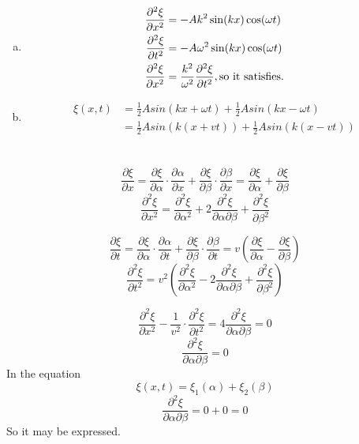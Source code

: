\documentclass{article}
\begin{document}
\section{}
\begin{enumerate}[(a)]
\item
\begin{align*}
\frac{\partial^2\xi}{\partial x^2}&=
-Ak^2\sin(kx)\cos(\omega t)\\
\frac{\partial^2\xi}{\partial t^2}&=
-A\omega^2\sin(kx)\cos(\omega t)\\
\frac{\partial^2\xi}{\partial x^2}&=
\frac{k^2}{\omega^2}\frac{\partial^2\xi}{\partial t^2},
{\rm so\ it\ satisfies.}\\
\end{align*}
\item
\begin{align*}
\xi(x,t)&=\frac{1}{2}Asin(kx+\omega t)+\frac{1}{2}Asin(kx-\omega t)\\
&=\frac{1}{2}Asin(k(x+vt))+\frac{1}{2}Asin(k(x-vt))
\end{align*}
\end{enumerate}

\section{}
$$\frac{\partial\xi}{\partial x}=\frac{\partial\xi}{\partial\alpha}\cdot\frac{\partial\alpha}{\partial x}+\frac{\partial\xi}{\partial\beta}\cdot\frac{\partial\beta}{\partial x}=\frac{\partial\xi}{\partial\alpha}+\frac{\partial\xi}{\partial\beta}$$
$$\frac{\partial^2\xi}{\partial x^2}=\frac{\partial^2\xi}{\partial\alpha^2}+2\frac{\partial^2\xi}{\partial\alpha\partial\beta}+\frac{\partial^2\xi}{\partial\beta^2}$$

$$\frac{\partial\xi}{\partial t}=\frac{\partial\xi}{\partial\alpha}\cdot\frac{\partial\alpha}{\partial t}+\frac{\partial\xi}{\partial\beta}\cdot\frac{\partial\beta}{\partial t}=v\left(\frac{\partial\xi}{\partial\alpha}-\frac{\partial\xi}{\partial\beta}\right)$$
$$\frac{\partial^2\xi}{\partial t^2}=v^2\left(\frac{\partial^2\xi}{\partial\alpha^2}-2\frac{\partial^2\xi}{\partial\alpha\partial\beta}+\frac{\partial^2\xi}{\partial\beta^2}\right)$$

$$\frac{\partial^2\xi}{\partial x^2}-\frac{1}{v^2}\cdot\frac{\partial^2\xi}{\partial t^2}=4\frac{\partial^2\xi}{\partial\alpha\partial\beta}=0$$
$$\frac{\partial^2\xi}{\partial\alpha\partial\beta}=0$$
In the equation
$$\xi(x,t)=\xi_1(\alpha)+\xi_2(\beta)$$
$$\frac{\partial^2\xi}{\partial\alpha\partial\beta}=0+0=0$$
So it may be expressed.
\end{document}
